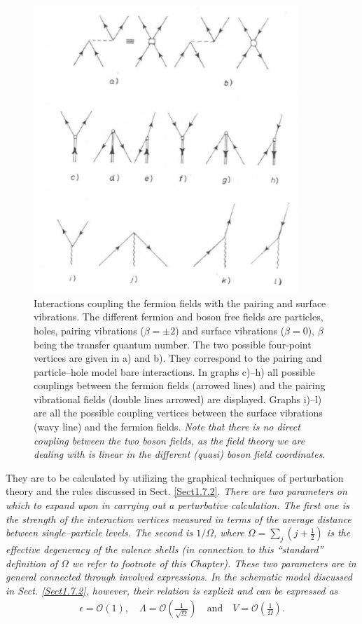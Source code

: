      \begin{figure}
     \centerline {
     \includegraphics*[width=10cm]{introduccion/figs/fig23}
     }
     \caption{Interactions coupling the fermion fields with the pairing and surface vibrations. The different fermion and boson free fields are particles, holes, pairing vibrations ($\beta=\pm2$) and surface vibrations ($\beta=0$), $\beta$ being the transfer quantum number. The two possible four-point vertices are given in a) and b). They correspond to the pairing and particle--hole model bare interactions. In graphs c)--h) all possible couplings between the fermion fields (arrowed lines) and the pairing vibrational fields (double lines arrowed) are displayed. Graphs i)--l) are all the possible coupling vertices between the surface vibrations (wavy line) and the fermion fields. \textit{Note that there is no direct coupling between the two boson fields, as the field theory we are dealing with is linear in the different (quasi) boson field coordinates}.}
     \label{figC1A6}
     \end{figure}

They are to be calculated by utilizing the graphical techniques of perturbation theory and the rules discussed in Sect. \ref{Sect1.7.2}. 
\textit{There are two parameters on which to expand upon in carrying out a perturbative  calculation. The first one is the strength of the interaction vertices measured in terms of the average distance between single--particle levels. The second is $1/\Omega$, where $\Omega=\sum_j(j+\frac{1}{2})$ is the effective degeneracy of the valence shells (in connection to this ``standard'' definition of $\Omega$ we refer to footnote  of this Chapter). These two parameters are in general connected through involved expressions. In the schematic model discussed in Sect. \ref{Sect1.7.2}, however, their relation is explicit and can be expressed as}
  \begin{align}\label{eqC1A86} 
   \epsilon=\mathcal O(1),\quad \Lambda=\mathcal O\left(\frac{1}{\sqrt{\Omega}}\right)\quad \text{and}\quad V=\mathcal O\left(\frac{1}{\Omega}\right).
    \end{align}   


